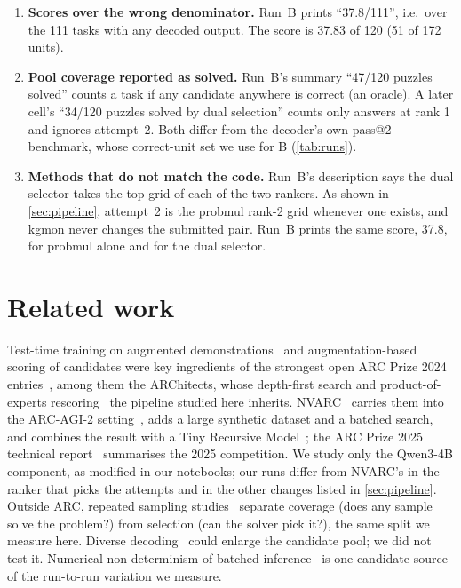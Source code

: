 \documentclass[11pt]{article}
\begin{document}
\begin{enumerate}
\item \textbf{Scores over the wrong denominator.} Run~B prints ``37.8/111'', i.e.\ over the 111 tasks with any decoded output. The score is 37.83 of 120 (51 of 172 units).
\item \textbf{Pool coverage reported as solved.} Run~B's summary ``47/120 puzzles solved'' counts a task if any candidate anywhere is correct (an oracle). A later cell's ``34/120 puzzles solved by dual selection'' counts only answers at rank 1 and ignores attempt~2. Both differ from the decoder's own pass@2 benchmark, whose correct-unit set we use for B (\cref{tab:runs}).
\item \textbf{Methods that do not match the code.} Run~B's description says the dual selector takes the top grid of each of the two rankers. As shown in \cref{sec:pipeline}, attempt~2 is the probmul rank-2 grid whenever one exists, and kgmon never changes the submitted pair. Run~B prints the same score, 37.8, for probmul alone and for the dual selector.
\end{enumerate}

\section{Related work}

Test-time training on augmented demonstrations~\citep{akyurek2024ttt} and augmentation-based scoring of candidates were key ingredients of the strongest open ARC Prize 2024 entries~\citep{chollet2024arcprize}, among them the ARChitects, whose depth-first search and product-of-experts rescoring~\citep{franzen2025poe} the pipeline studied here inherits. NVARC~\citep{nvarc2025} carries them into the ARC-AGI-2 setting~\citep{chollet2025arcagi2}, adds a large synthetic dataset and a batched search, and combines the result with a Tiny Recursive Model~\citep{jolicoeur2025trm}; the ARC Prize 2025 technical report~\citep{arcprize2025report} summarises the 2025 competition. We study only the Qwen3-4B component, as modified in our notebooks; our runs differ from NVARC's in the ranker that picks the attempts and in the other changes listed in \cref{sec:pipeline}.
Outside ARC, repeated sampling studies~\citep{brown2024monkeys} separate coverage (does any sample solve the problem?) from selection (can the solver pick it?), the same split we measure here.
Diverse decoding~\citep{vijayakumar2016diverse} could enlarge the candidate pool; we did not test it.
Numerical non-determinism of batched inference~\citep{he2025nondeterminism} is one candidate source of the run-to-run variation we measure.
\end{document}
